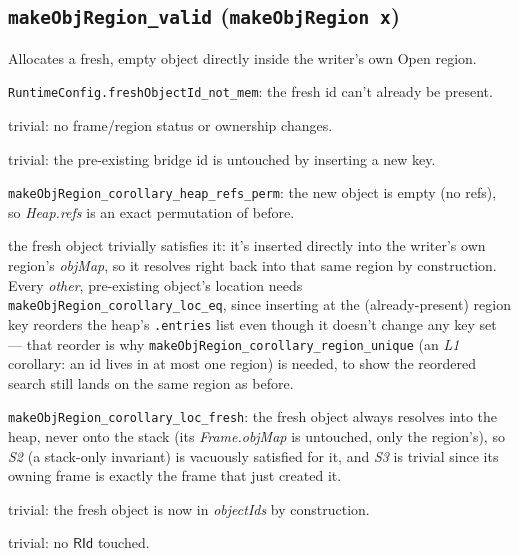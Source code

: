 \documentclass[11pt]{article}
\newcommand{\op}[1]{\texttt{#1}}
\newcommand{\thm}[1]{\textbf{\texttt{#1}}}
\begin{document}
\subsection{\thm{makeObjRegion\_valid} (\op{makeObjRegion x})}
Allocates a fresh, empty object directly inside the writer's own Open region.
\begin{description}[nosep]
  \item[L1] \texttt{RuntimeConfig.freshObjectId\_not\_mem}: the fresh id can't already be present.
  \item[L2, S1] trivial: no frame/region status or ownership changes.
  \item[H1] trivial: the pre-existing bridge id is untouched by inserting a new key.
  \item[H2] \texttt{makeObjRegion\_corollary\_heap\_refs\_perm}: the new object is empty (no
    refs), so \textit{Heap.refs} is an exact permutation of before.
  \item[H3] the fresh object trivially satisfies it: it's inserted directly into the writer's own
    region's \textit{objMap}, so it resolves right back into that same region by construction.
    Every \emph{other}, pre-existing object's location needs
    \texttt{makeObjRegion\_corollary\_loc\_eq}, since inserting at the (already-present) region key
    reorders the heap's \texttt{.entries} list even though it doesn't change any key set --- that
    reorder is why \texttt{makeObjRegion\_corollary\_region\_unique} (an \textit{L1} corollary: an
    id lives in at most one region) is needed, to show the reordered search still lands on the
    same region as before.
  \item[S2, S3] \texttt{makeObjRegion\_corollary\_loc\_fresh}: the fresh object always resolves
    into the heap, never onto the stack (its \textit{Frame.objMap} is untouched, only the
    region's), so \textit{S2} (a stack-only invariant) is vacuously satisfied for it, and
    \textit{S3} is trivial since its owning frame is exactly the frame that just created it.
  \item[HS1] trivial: the fresh object is now in \textit{objectIds} by construction.
  \item[HS2] trivial: no $\mathsf{RId}$ touched.
\end{description}
\end{document}

